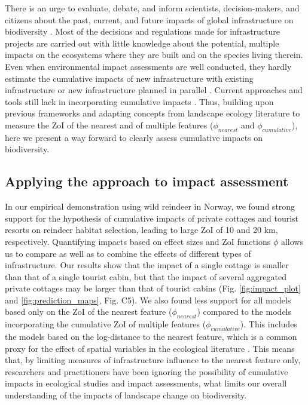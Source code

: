 \documentclass[titlepage]{article}
\begin{document}
There is an urge to evaluate, debate, and inform scientists, decision-makers, and citizens about the past, current, and future impacts of global infrastructure on biodiversity \citep{laurance_conservation_2018}. Most of the decisions and regulations made for infrastructure projects are carried out with little knowledge about the potential, multiple impacts on the ecosystems where they are built and on the species living therein. Even when environmental impact assessments are well conducted, they hardly estimate the cumulative impacts of new infrastructure with existing infrastructure or new infrastructure planned in parallel \citep{laurance_roads_2017, johnson_regulating_2011}. Current approaches and tools still lack in incorporating cumulative impacts \citep[but see][for recent advances]{gillingham_integration_2016}. Thus, building upon previous frameworks \citep{naugle_unifying_2011} and adapting concepts from landscape ecology literature to measure the ZoI of the nearest and of multiple features ($\phi_{nearest}$ and $\phi_{cumulative}$), here we present a way forward to clearly assess cumulative impacts on biodiversity. 

\subsection{Applying the approach to impact assessment}

In our empirical demonstration using wild reindeer in Norway, we found strong support for the hypothesis of cumulative impacts of private cottages and tourist resorts on reindeer habitat selection, leading to large ZoI of 10 and 20 km, respectively. Quantifying impacts based on effect sizes and ZoI functions $\phi$ allows us to compare as well as to combine the effects of different types of infrastructure. Our results show that the impact of a single cottage is smaller than that of a single tourist cabin, but that the impact of several aggregated private cottages may be larger than that of tourist cabins (Fig. \ref{fig:impact_plot} and \ref{fig:prediction_maps}, Fig. C5). We also found less support for all models based only on the ZoI of the nearest feature ($\phi_{nearest}$) compared to the models incorporating the cumulative ZoI of multiple features ($\phi_{cumulative}$). This includes the models based on the log-distance to the nearest feature, which is a common proxy for the effect of spatial variables in the ecological literature \citep[e.g.][]{torres_assessing_2016,polfus_identifying_2011}. This means that, by limiting measures of infrastructure influence to the nearest feature only, researchers and practitioners have been ignoring the possibility of cumulative impacts in ecological studies and impact assessments, what limits our overall understanding of the impacts of landscape change on biodiversity.
\end{document}

